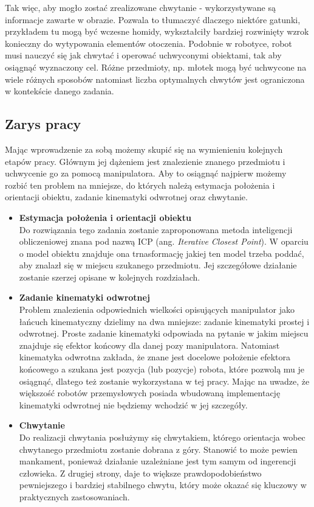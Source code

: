 \documentclass{article}
\begin{document}
Tak więc, aby mogło zostać zrealizowane chwytanie -  wykorzystywane są informacje zawarte w obrazie. Pozwala to tłumaczyć dlaczego niektóre gatunki, przykładem tu mogą być wczesne homidy, wykształciły bardziej rozwinięty wzrok konieczny do wytypowania elementów otoczenia. Podobnie w robotyce, robot musi nauczyć się jak chwytać i operować uchwyconymi obiektami, tak aby osiągnąć wyznaczony cel. Różne przedmioty, np. młotek mogą być uchwycone na wiele różnych sposobów natomiast liczba optymalnych chwytów jest ograniczona w kontekście danego zadania. 

\subsection*{\LARGE{Zarys pracy}} 

Mając wprowadzenie za sobą możemy skupić się na wymienieniu kolejnych etapów pracy. Głównym jej dążeniem jest znalezienie znanego przedmiotu i uchwycenie go za pomocą manipulatora. Aby to osiągnąć najpierw możemy rozbić ten problem na mniejsze, do których należą estymacja położenia i orientacji obiektu, zadanie kinematyki odwrotnej oraz chwytanie.

\begin{itemize}
\item \textbf{Estymacja położenia i orientacji obiektu} \\
Do rozwiązania tego zadania zostanie zaproponowana metoda inteligencji obliczeniowej znana pod nazwą ICP (ang. \emph{Iterative Closest Point}). W oparciu o model obiektu znajduje ona trnasformację jakiej ten model trzeba poddać, aby znalazł się w miejscu szukanego przedmiotu. Jej szczegółowe działanie zostanie szerzej opisane w kolejnych rozdziałach.

\item \textbf{Zadanie kinematyki odwrotnej} \\
Problem znalezienia odpowiednich wielkości opisujących manipulator jako łańcuch kinematyczny dzielimy na dwa mniejsze: zadanie kinematyki prostej i odwrotnej. Proste zadanie kinematyki odpowiada na pytanie w jakim miejscu znajduje się efektor końcowy dla danej pozy manipulatora. Natomiast kinematyka odwrotna zakłada, że znane jest docelowe położenie efektora końcowego a szukana jest pozycja (lub pozycje) robota, które pozwolą mu je osiągnąć, dlatego też zostanie wykorzystana w tej pracy. Mając na uwadze, że większość robotów przemysłowych posiada wbudowaną implementację kinematyki odwrotnej nie będziemy wchodzić w jej szczegóły.

\item \textbf{Chwytanie} \\
Do realizacji chwytania posłużymy się chwytakiem, którego orientacja wobec chwytanego przedmiotu zostanie dobrana z góry. Stanowić to może pewien mankament, ponieważ działanie uzależniane jest tym samym od ingerencji człowieka. Z drugiej strony, daje to większe prawdopodobieństwo pewniejszego i bardziej stabilnego chwytu, który może okazać się kluczowy w praktycznych zastosowaniach.
\end{itemize}
\end{document}
